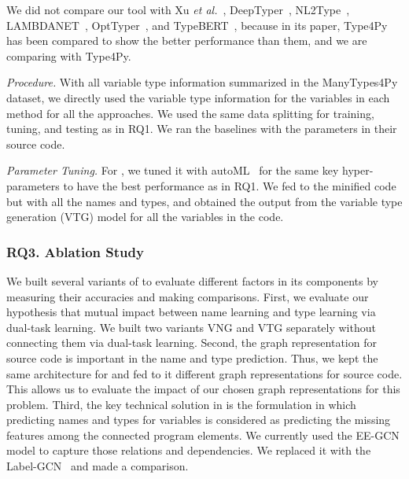 
We did not compare our tool with Xu {\em et al.}~\cite{xu-fse16},
DeepTyper~\cite{DeepTyper-fse18}, NL2Type~\cite{nl2type-icse19},
LAMBDANET~\cite{LambdaNet-iclr20}, OptTyper~\cite{optyper20}, and
TypeBERT~\cite{typeBERT-fse21}, because in its paper, Type4Py has been
compared to show the better performance than them, and we are comparing
with Type4Py.


\textit{Procedure.}
With all variable type information summarized in the ManyTypes4Py
dataset, we directly used the variable type information for the
variables in each method for all the approaches. We used the same data
splitting for training, tuning, and testing as in RQ1. We ran the
baselines with the parameters in their source code.

{\em Parameter Tuning.} For {\tool}, we tuned it with
autoML~\cite{NNI} for the same key hyper-parameters to have the best
performance as in RQ1. We fed to {\tool} the minified code but with
all the names and types, and obtained the output from the variable
type generation (VTG) model for all the variables in the code.


\subsubsection{RQ3. Ablation Study}

We built several variants of {\tool} to evaluate different factors in
its components by measuring their accuracies and making comparisons.
First, we evaluate our hypothesis that mutual impact between name
learning and type learning via dual-task learning. We built two
variants VNG and VTG separately without connecting them via dual-task
learning. Second, the graph representation for source code is
important in the name and type prediction. Thus, we kept the same
architecture for {\tool} and fed to it different graph representations
for source code. This allows us to evaluate the impact of our chosen
graph representations for this problem. Third, the key technical
solution in {\tool} is the formulation in which predicting names and
types for variables is considered as predicting the missing features
among the connected program elements. We currently used the EE-GCN
model to capture those relations and dependencies. We replaced
it with the Label-GCN~\cite{label-gcn} and made a comparison.

